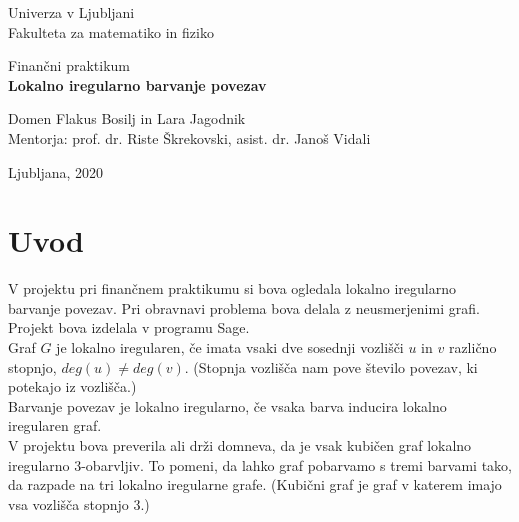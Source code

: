 \documentclass[12pt, a4paper]{article}
\begin{document}
\begin{titlepage}
\begin{center}

\large
Univerza v Ljubljani\\
\normalsize
Fakulteta za matematiko in fiziko\\

\vspace{5 cm} 

\large
Finančni praktikum \\


\vspace{0.5cm}
\LARGE
\textbf{Lokalno iregularno barvanje povezav}

\vspace{0.5 cm}

\large
Domen Flakus Bosilj in Lara Jagodnik \\


\vspace{1.5cm}
\normalsize
Mentorja: prof. dr. Riste Škrekovski, asist. dr. Janoš Vidali
\vspace{3cm}


\vfill

\large Ljubljana, 2020

\end{center}
\end{titlepage}


\newpage

\section{Uvod}

V projektu pri finančnem praktikumu si bova ogledala lokalno iregularno barvanje povezav. Pri obravnavi problema bova delala z neusmerjenimi grafi. Projekt bova izdelala v programu Sage. \\
Graf $G$ je lokalno iregularen, če imata vsaki dve sosednji vozlišči $u$ in $v$ različno stopnjo, $deg(u) \neq deg(v)$. (Stopnja vozlišča nam pove število povezav, ki potekajo iz vozlišča.) \\
Barvanje povezav je lokalno iregularno, če vsaka barva inducira lokalno iregularen graf. \\
V projektu bova preverila ali drži domneva, da je vsak kubičen graf lokalno iregularno 3-obarvljiv. To pomeni, da lahko graf pobarvamo s tremi barvami tako, da razpade na tri lokalno iregularne grafe. (Kubični graf je graf v katerem imajo vsa vozlišča stopnjo 3.)\\
\end{document}

